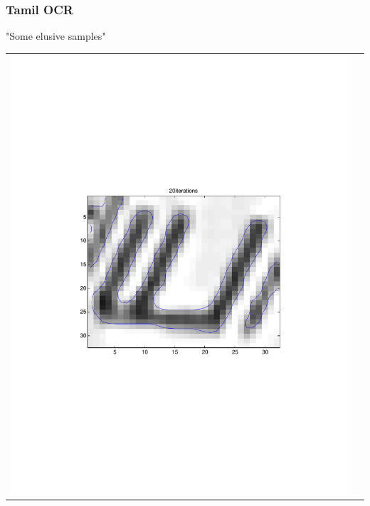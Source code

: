 \documentclass{beamer}
\begin{document}
\begin{frame}
  \frametitle{Tamil OCR}
  "Some elusive samples"
\begin{center}
\begin{tabular}{ | c | c |}
\hline
\includegraphics[scale=0.1]{./img/ya} &

\end{tabular}
\end{center}
\end{frame}
\end{document}
